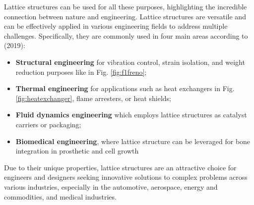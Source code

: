 Lattice structures can be used for all these purposes, highlighting the incredible connection between nature and engineering. Lattice structures are versatile and can be effectively applied in various engineering fields to address multiple challenges. Specifically, they are commonly used in four main areas according to \citeauthor{bhate_classification_2019} (2019): 
\begin{itemize}
    \item \textbf{Structural engineering} for vibration control, strain isolation, and weight reduction purposes like in Fig. \ref{fig:f1freno};
    \item \textbf{Thermal engineering} for applications such as heat exchangers in Fig. \ref{fig:heatexchanger}, flame arresters, or heat shields;
    \item \textbf{Fluid dynamics engineering} which employs lattice structures as catalyst carriers or packaging;
    \item \textbf{Biomedical engineering}, where lattice structure can be leveraged for bone integration in prosthetic and cell growth
\end{itemize} 
Due to their unique properties, lattice structures are an attractive choice for engineers and designers seeking innovative solutions to complex problems across various industries, especially in the automotive, aerospace, energy and commodities, and medical industries.
